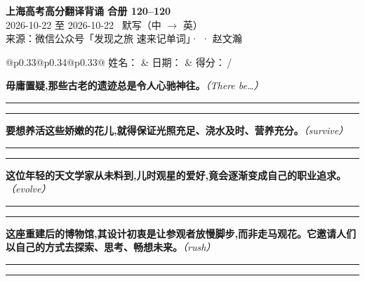 \documentclass[11pt,a4paper]{article}
\newcommand{\num}[1]{\makebox[1.9em][r]{#1.}\hspace{0.3em}}
\newcommand{\wline}{\noindent\rule{\linewidth}{0.4pt}}
\newcommand{\prompt}[1]{\emph{\textcolor{tipblue}{\small（#1）}}}
\begin{document}
\pagestyle{plain}
\begin{center}
{\LARGE\bfseries 上海高考高分翻译背诵 \quad 合册 120–120}\\[0.25em]
{\large 2026-10-22 至 2026-10-22 \quad\ 默写（中 $\to$ 英）}\\[0.35em]
{\footnotesize 来源：微信公众号「发现之旅 速来记单词」·  · 赵文瀚}
\end{center}

\vspace{0.4em}
\noindent\begin{tabular}{@{}p{0.33\textwidth}@{}p{0.34\textwidth}@{}p{0.33\textwidth}@{}}
姓名：\underline{\hspace{2.0cm}} & 日期：\underline{\hspace{2.0cm}} & 得分：\underline{\hspace{1.4cm}}\,/ \\
\end{tabular}

\vspace{0.5em}

\vspace{0.8em}
\vspace{0.35em}\vspace{0.15em}

\begin{minipage}{\linewidth}

\num{1}\textbf{毋庸置疑,那些古老的遗迹总是令人心驰神往。}\prompt{There be…}

\vspace{0.3em}

\wline\vspace{0.3em}
\wline

\end{minipage}

\begin{minipage}{\linewidth}

\num{2}\textbf{要想养活这些娇嫩的花儿,就得保证光照充足、浇水及时、营养充分。}\prompt{survive}

\vspace{0.3em}

\wline\vspace{0.3em}
\wline

\end{minipage}

\begin{minipage}{\linewidth}

\num{3}\textbf{这位年轻的天文学家从未料到,儿时观星的爱好,竟会逐渐变成自己的职业追求。}\prompt{evolve}

\vspace{0.3em}

\wline\vspace{0.3em}
\wline

\end{minipage}

\begin{minipage}{\linewidth}

\num{4}\textbf{这座重建后的博物馆,其设计初衷是让参观者放慢脚步,而非走马观花。它邀请人们以自己的方式去探索、思考、畅想未来。}\prompt{rush}

\vspace{0.3em}

\wline\vspace{0.3em}
\wline

\end{minipage}
\end{document}
